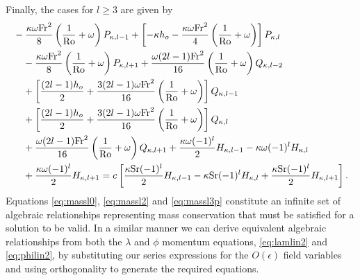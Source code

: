 Finally, the cases for $l\ge3$ are given by
\begin{align}
&-\frac{\kappa \omega \mathrm{Fr}^2}{8}\left( \frac{1}{\mathrm{Ro}}+\omega \right)P_{\kappa,l-1} + \left[-\kappa h_o -\frac{\kappa \omega \mathrm{Fr}^2}{4}\left( \frac{1}{\mathrm{Ro}}+\omega \right)\right] P_{\kappa,l} \notag \\
&\quad-\frac{\kappa \omega \mathrm{Fr}^2}{8}\left( \frac{1}{\mathrm{Ro}}+\omega \right)P_{\kappa,l+1} +\frac{\omega (2l-1)\mathrm{Fr}^2}{16}\left( \frac{1}{\mathrm{Ro}}+\omega \right)Q_{\kappa,l-2} \notag\\
&\quad+ \left[\frac{(2l-1) h_o}{2} +\frac{3(2l-1)\omega \mathrm{Fr}^2}{16}\left( \frac{1}{\mathrm{Ro}}+\omega \right)\right] Q_{\kappa,l-1} \notag \\
&\quad+\left[\frac{(2l-1) h_o}{2}+\frac{3(2l-1)\omega \mathrm{Fr}^2}{16}\left( \frac{1}{\mathrm{Ro}}+\omega \right)\right] Q_{\kappa,l} \notag \\
&\quad+\frac{\omega(2l-1) \mathrm{Fr}^2}{16}\left( \frac{1}{\mathrm{Ro}}+\omega \right) Q_{\kappa,l+1}+\frac{\kappa \omega (-1)^l}{2}H_{\kappa,l-1}-\kappa \omega (-1)^l H_{\kappa,l}\notag \\
&\quad+\frac{\kappa \omega (-1)^l}{2}H_{\kappa,l+1}=c\left[\frac{\kappa \mathrm{Sr}(-1)^l}{2} H_{\kappa,l-1}-\kappa \mathrm{Sr}(-1)^l H_{\kappa,l}+\frac{\kappa \mathrm{Sr}(-1)^l}{2} H_{\kappa,l+1} \right]. \label{eq:massl3p}
\end{align}
Equations \eqref{eq:massl0}, \eqref{eq:massl2} and \eqref{eq:massl3p} constitute an infinite set of algebraic relationships representing mass conservation that must be satisfied for a solution to be valid. In a similar manner we can derive equivalent algebraic relationships from both the $\lambda$ and $\phi$ momentum equations, \eqref{eq:lamlin2} and \eqref{eq:philin2}, by substituting our series expressions for the $O(\epsilon)$ field variables and using orthogonality to generate the required equations.

